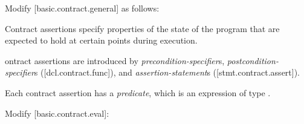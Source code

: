 Modify [basic.contract.general] as follows:
\begin{adjustwidth}{0.5cm}{0.5cm}
Contract assertions specify properties of the state of the program that are expected to hold at certain points during execution.

ontract assertions are introduced by \emph{precondition-specifier}s, \emph{postcondition-specifier}s ([dcl.contract.func]), and \emph{assertion-statement}s ([stmt.contract.assert]). 

Each contract assertion has a \emph{predicate}, which is an expression of type .  
\end{adjustwidth}

Modify [basic.contract.eval]:

